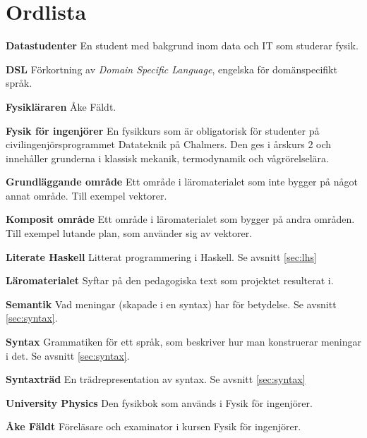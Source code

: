 
\chapter*{Ordlista}

\textbf{Datastudenter} En student med bakgrund inom data och IT som studerar fysik.

\textbf{DSL} Förkortning av \textit{Domain Specific Language}, engelska för domänspecifikt språk.

\textbf{Fysikläraren} Åke Fäldt.

\textbf{Fysik för ingenjörer} En fysikkurs som är obligatorisk för studenter på civilingenjörsprogrammet Datateknik på Chalmers. Den ges i årskurs 2 och innehåller grunderna i klassisk mekanik, termodynamik och vågrörelselära.

\textbf{Grundläggande område} Ett område i läromaterialet som inte bygger på något annat område. Till exempel vektorer.

\textbf{Komposit område} Ett område i läromaterialet som bygger på andra områden. Till exempel lutande plan, som använder sig av vektorer.

\textbf{Literate Haskell} Litterat programmering i Haskell. Se avsnitt \ref{sec:lhs}

\textbf{Läromaterialet} Syftar på den pedagogiska text som projektet resulterat i.

\textbf{Semantik} Vad meningar (skapade i en syntax) har för betydelse. Se avsnitt \ref{sec:syntax}.

\textbf{Syntax} Grammatiken för ett språk, som beskriver hur man konstruerar meningar i det. Se avsnitt \ref{sec:syntax}.

\textbf{Syntaxträd} En trädrepresentation av syntax. Se avsnitt \ref{sec:syntax}

\textbf{University Physics} Den fysikbok som används i Fysik för ingenjörer.

\textbf{Åke Fäldt} Föreläsare och examinator i kursen Fysik för ingenjörer.
